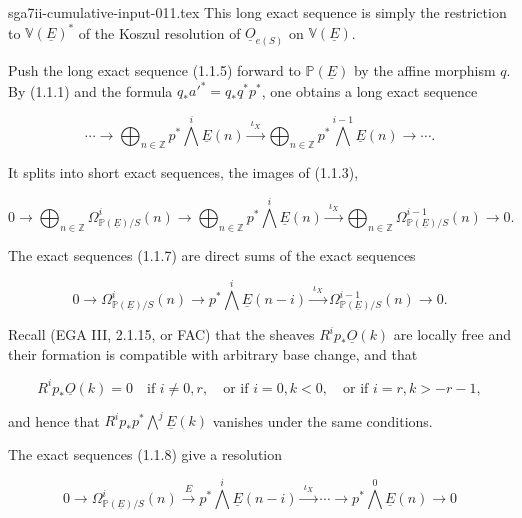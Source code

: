 \begin{filecontents*}{sga7ii-cumulative-input-011.tex}
This long exact sequence is simply the restriction to
$\mathbb V(\underline E)^*$ of the Koszul resolution of
$\underline O_{e(S)}$ on $\mathbb V(\underline E)$.

Push the long exact sequence (1.1.5) forward to $\mathbb P(\underline E)$ by
the affine morphism $q$.  By (1.1.1) and the formula
$q_*{a'}^*=q_*q^*p^*$, one obtains a long exact sequence

\begin{equation}\tag{1.1.6}
\cdots\longrightarrow
\bigoplus_{n\in\mathbb Z}p^*\bigwedge^i\underline E(n)
\xrightarrow{\ \iota_X\ }
\bigoplus_{n\in\mathbb Z}p^*\bigwedge^{i-1}\underline E(n)
\longrightarrow\cdots .
\end{equation}

It splits into short exact sequences, the images of (1.1.3),

\begin{equation}\tag{1.1.7}
0\longrightarrow
\bigoplus_{n\in\mathbb Z}\Omega^i_{\mathbb P(\underline E)/S}(n)
\longrightarrow
\bigoplus_{n\in\mathbb Z}p^*\bigwedge^i\underline E(n)
\xrightarrow{\ \iota_X\ }
\bigoplus_{n\in\mathbb Z}\Omega^{i-1}_{\mathbb P(\underline E)/S}(n)
\longrightarrow0.
\end{equation}

The exact sequences (1.1.7) are direct sums of the exact sequences

\begin{equation}\tag{1.1.8}
0\longrightarrow\Omega^i_{\mathbb P(\underline E)/S}(n)
\longrightarrow p^*\bigwedge^i\underline E(n-i)
\xrightarrow{\ \iota_X\ }
\Omega^{i-1}_{\mathbb P(\underline E)/S}(n)
\longrightarrow0.
\end{equation}

Recall (EGA III, 2.1.15, or FAC) that the sheaves
$R^ip_*\underline O(k)$ are locally free and their formation is compatible
with arbitrary base change, and that

\begin{equation}\tag{1.1.9}
R^ip_*\underline O(k)=0
\quad\text{if }i\ne0,r,
\quad\text{or if }i=0, k<0,
\quad\text{or if }i=r, k>-r-1,
\end{equation}

and hence that $R^ip_*p^*\bigwedge^j\underline E(k)$ vanishes under the
same conditions.

The exact sequences (1.1.8) give a resolution

\begin{equation}\tag{1.1.10}
0\longrightarrow\Omega^i_{\mathbb P(\underline E)/S}(n)
\xrightarrow{\ E\ }p^*\bigwedge^i\underline E(n-i)
\xrightarrow{\ \iota_X\ }\cdots\longrightarrow
p^*\bigwedge^0\underline E(n)\longrightarrow0
\end{equation}


\end{filecontents*}
